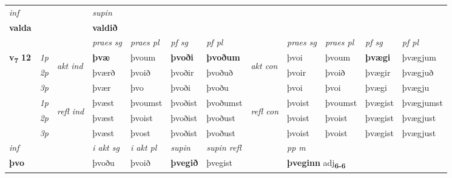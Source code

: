\begin{longtable}[l]{X>{\footnotesize\itshape}llXXXXlXXXX}
   {\textit{inf}} & &      & \textit{supin}   \\*
  {\textbf{valda}} & &      &  \textbf{valdið}   \\*

\midrule

 & &   & \textit{praes sg}  & \textit{praes pl}    & \textit{ pf sg} & \textit{pf pl} & & \textit{praes sg}  & \textit{praes pl}    & \textit{pf sg} & \textit{pf pl }  \\ \cmidrule{4-7} \cmidrule{9-12}
 \multirow{2}{*}{{{\textbf{v{\textsubscript{7}}} \Large{\textbf{12}}}}}  & 1p & \multirow{3}{*}{\begin{turn}{90}\textit{akt ind}\end{turn}} & \textbf{þvæ} & þvoum & \textbf{þvoði} & \textbf{þvoðum} & \multirow{3}{*}{\begin{turn}{90}\textit{akt con}\end{turn}} &þvoi & þvoum & \textbf{þvægi} & þvægjum\\*
 & 2p &  &  þværð  & þvoið & þvoðir & þvoðuð & & þvoir & þvoið & þvægir & þvægjuð \\*
 & 3p &  & þvær & þvo & þvoði & þvoðu & & þvoi & þvoi& þvægi & þvægju \\*
\cmidrule{4-7} \cmidrule{9-12}
 & 1p & \multirow{3}{*}{\begin{turn}{90}\textit{refl ind}\end{turn}}  & þvæst & þvoumst & þvoðist & þvoðumst & \multirow{3}{*}{\begin{turn}{90}\textit{refl con}\end{turn}}  &þvoist & þvoumst & þvægist & þvægjumst \\*
 & 2p &  & þvæst & þvoist & þvoðist & þvoðust & &þvoist & þvoist & þvægist & þvægjust \\*
 & 3p  & & þvæst & þvost & þvoðist & þvoðust & & þvoist & þvoist& þvægist & þvægjust \\*
\cmidrule{4-7} \cmidrule{9-12}

   {\textit{inf}} & &  & \textit{i akt sg} & \textit{i akt pl}    & \textit{supin} & \textit{supin refl} && \textit{pp m} \\*
  {\textbf{þvo}} & && þvoðu  & þvoið    &  \textbf{þvegið} & þvegist && \multicolumn{2}{l}{\textbf{þveginn} adj\textbf{\textsubscript{6-6}}} \\*


\end{longtable}
